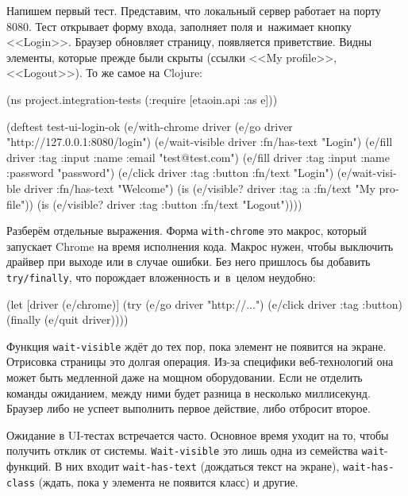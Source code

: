 
Напишем первый тест. Представим, что локальный сервер работает на порту
8080. Тест открывает форму входа, заполняет поля и~нажимает кнопку
<<Login>>. Браузер обновляет страницу, появляется приветствие. Видны элементы,
которые прежде были скрыты (ссылки <<My profile>>, <<Logout>>). То же самое на
Clojure:

\begin{english}
  \begin{clojure}
(ns project.integration-tests
  (:require [etaoin.api :as e]))

(deftest test-ui-login-ok
  (e/with-chrome {} driver
    (e/go driver "http://127.0.0.1:8080/login")
    (e/wait-visible driver {:fn/has-text "Login"})
    (e/fill driver {:tag :input :name :email} "test@test.com")
    (e/fill driver {:tag :input :name :password} "password")
    (e/click driver {:tag :button :fn/text "Login"})
    (e/wait-visible driver {:fn/has-text "Welcome"})
    (is (e/visible? driver {:tag :a :fn/text "My profile"}))
    (is (e/visible? driver {:tag :button :fn/text "Logout"}))))
  \end{clojure}
\end{english}

Разберём отдельные выражения. Форма \verb|with-chrome| это макрос, который
запускает Chrome на время исполнения кода. Макрос нужен, чтобы выключить драйвер
при выходе или в случае ошибки. Без него пришлось бы добавить
\verb|try/finally|, что порождает вложенность и~в~целом неудобно:


\begin{english}
  \begin{clojure}
(let [driver (e/chrome)]
  (try
    (e/go driver "http://...")
    (e/click driver {:tag :button})
    (finally
      (e/quit driver))))
  \end{clojure}
\end{english}


Функция \verb|wait-visible| ждёт до тех пор, пока элемент не появится на
экране. Отрисовка страницы это долгая операция. Из-за специфики веб-технологий
она может быть медленной даже на мощном оборудовании. Если не отделить команды
ожиданием, между ними будет разница в несколько миллисекунд. Браузер либо не
успеет выполнить первое действие, либо отбросит второе.

Ожидание в UI-тестах встречается часто. Основное время уходит на то, чтобы
получить отклик от системы. \verb|Wait-visible| это лишь одна из семейства
\verb|wait|-функций. В них входит \verb|wait-has-text| (дождаться текст на
экране), \verb|wait-has-class| (ждать, пока у элемента не появится класс) и
другие.

